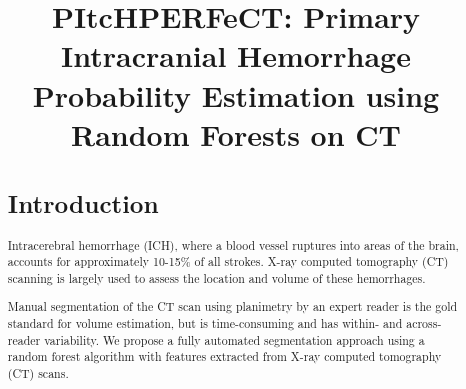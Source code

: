 \documentclass{elsarticle_nonatbib}\usepackage[]{graphicx}\usepackage[]{color}
\begin{document}
\graphicspath{{figures/}} %


\begin{frontmatter}

\date{}

\title{PItcHPERFeCT: Primary Intracranial Hemorrhage Probability Estimation using Random Forests on CT}










\address[jhsph]{Department of Biostatistics, Bloomberg School of Public Health, Johns Hopkins University, Baltimore, MD, USA}
\address[jhmi]{Department of Neurology, Division of Brain Injury Outcomes,  Johns Hopkins Medical Institutions, Baltimore, MD, USA}
\address[ucla]{Department of Neurosurgery, David Geffen School of Medicine at UCLA, Los Angeles, CA, USA}












\begin{abstract}


\section*{Introduction}

Intracerebral hemorrhage (ICH), where a blood vessel ruptures into areas of the brain, accounts for approximately 10-15\% of all strokes.  X-ray computed tomography (CT) scanning is largely used to assess the location and volume of these hemorrhages.

Manual segmentation of the CT scan using planimetry by an expert reader is the gold standard for volume estimation, but is time-consuming and has within- and across-reader variability.  We propose a fully automated segmentation approach using a random forest algorithm with features extracted from X-ray computed tomography (CT) scans.
\vspace{-1em}

\end{abstract}
\end{frontmatter}
\end{document}
